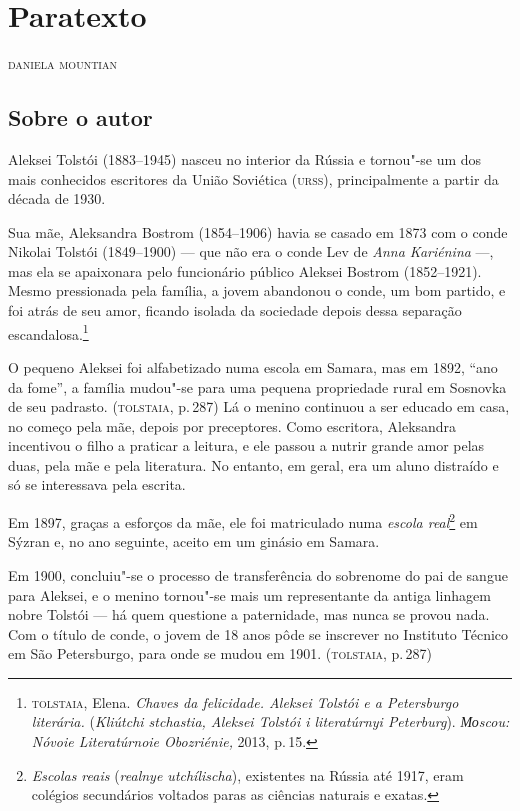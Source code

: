 \chapter{Paratexto}\label{paratexto}

\begin{flushright}
\textsc{daniela mountian}
\end{flushright}

\medskip

\section{Sobre o autor}\label{para1}

Aleksei Tolstói (1883--1945) nasceu no interior da Rússia e tornou"-se um
dos mais conhecidos escritores da União Soviética (\textsc{urss}), principalmente
a partir da década de 1930.

Sua mãe, Aleksandra Bostrom (1854--1906) havia se casado em 1873 com o
conde Nikolai Tolstói (1849--1900) --- que não era o conde Lev de
\emph{Anna Kariénina} ---, mas ela se apaixonara pelo funcionário
público Aleksei Bostrom (1852--1921). Mesmo pressionada pela família, a
jovem abandonou o conde, um bom partido, e foi atrás de seu amor,
ficando isolada da sociedade depois dessa separação
escandalosa.\footnote{\textsc{tolstaia}, Elena. \emph{Chaves da felicidade.
  Aleksei Tolstói e a Petersburgo literária.} (\emph{Kliútchi stchastia,
  Aleksei Tolstói i literatúrnyi Peterburg}). \emph{Моscou: Nóvoie
  Literatúrnoie Obozriénie,} 2013, p.\,15.}

O pequeno Aleksei foi alfabetizado numa escola em Samara, mas em 1892,
``ano da fome'', a família mudou"-se para uma pequena propriedade rural
em Sosnovka de seu padrasto. (\textsc{tolstaia}, p.\,287) Lá o menino continuou a
ser educado em casa, no começo pela mãe, depois por preceptores. Como
escritora, Aleksandra incentivou o filho a praticar a leitura, e ele
passou a nutrir grande amor pelas duas, pela mãe e pela literatura. No
entanto, em geral, era um aluno distraído e só se interessava pela
escrita.

Em 1897, graças a esforços da mãe, ele foi matriculado numa \emph{escola
real}\footnote{\emph{Escolas reais} (\emph{realnye utchílischa}),
  existentes na Rússia até 1917, eram colégios secundários voltados
  paras as ciências naturais e exatas.} em Sýzran e, no ano seguinte,
aceito em um ginásio em Samara.

Em 1900, concluiu"-se o processo de transferência do sobrenome do pai de
sangue para Aleksei, e o menino tornou"-se mais um representante da
antiga linhagem nobre Tolstói --- há quem questione a paternidade, mas
nunca se provou nada. Com o título de conde, o jovem de 18 anos pôde se
inscrever no Instituto Técnico em São Petersburgo, para onde se mudou em
1901. (\textsc{tolstaia}, p.\,287)

